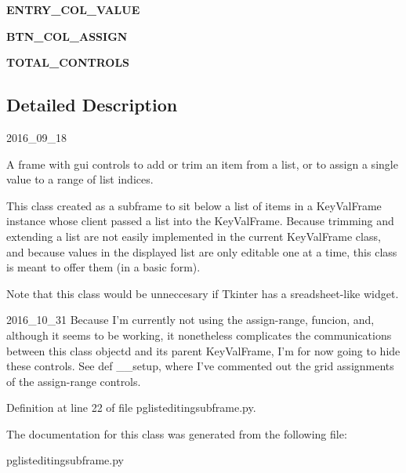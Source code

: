 \begin{DoxyCompactItemize}
\item 
{\bfseries E\+N\+T\+R\+Y\+\_\+\+C\+O\+L\+\_\+\+V\+A\+L\+UE}\hypertarget{classnegui_1_1pglisteditingsubframe_1_1ListEditingSubframe_aed6da663d989087c187fff50769f90e2}{}\label{classnegui_1_1pglisteditingsubframe_1_1ListEditingSubframe_aed6da663d989087c187fff50769f90e2}

\item 
{\bfseries B\+T\+N\+\_\+\+C\+O\+L\+\_\+\+A\+S\+S\+I\+GN}\hypertarget{classnegui_1_1pglisteditingsubframe_1_1ListEditingSubframe_a67e8a78c5364e0adfe24e881f5c7891f}{}\label{classnegui_1_1pglisteditingsubframe_1_1ListEditingSubframe_a67e8a78c5364e0adfe24e881f5c7891f}

\item 
{\bfseries T\+O\+T\+A\+L\+\_\+\+C\+O\+N\+T\+R\+O\+LS}\hypertarget{classnegui_1_1pglisteditingsubframe_1_1ListEditingSubframe_ad63121db3667ca83f5f565b8a0a16e9b}{}\label{classnegui_1_1pglisteditingsubframe_1_1ListEditingSubframe_ad63121db3667ca83f5f565b8a0a16e9b}

\end{DoxyCompactItemize}


\subsection{Detailed Description}
\begin{DoxyVerb}2016_09_18

A frame with gui controls to add or trim
an item from a list, or to assign a single
value to a range of list indices.  

This class created as a subframe to sit
below a list of items in a KeyValFrame
instance whose client passed a list into
the KeyValFrame.  Because trimming and extending
a list are not easily implemented in the current
KeyValFrame class, and because values in the displayed
list are only editable one at a time, this
class is meant to offer them (in a basic form). 

Note that this class would be unneccesary if Tkinter
has a sreadsheet-like widget.

2016_10_31 
Because I'm currently not using the assign-range, 
funcion, and, although it seems to be working, it nonetheless
complicates the communications between this class objectd
and its parent KeyValFrame, I'm for now going to hide these
controls. See def __setup, where I've commented out the
grid assignments of the assign-range controls.
\end{DoxyVerb}
 

Definition at line 22 of file pglisteditingsubframe.\+py.



The documentation for this class was generated from the following file\+:\begin{DoxyCompactItemize}
\item 
pglisteditingsubframe.\+py\end{DoxyCompactItemize}
